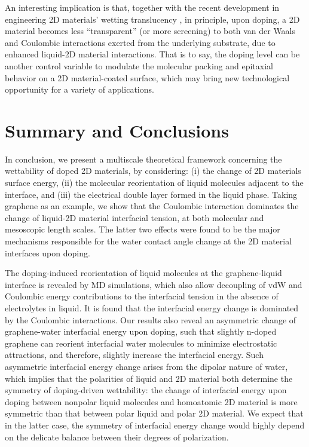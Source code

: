 \documentclass[journal=langd5,manuscript=article,email=true,hyperref=true,keywords=true]{achemso}
\begin{document}
An interesting implication is that, together with the recent
development in engineering 2D materials’ wetting translucency
\cite{raj_wettability_2013,rafiee_wetting_2012,shih_breakdown_2012,shih_wetting_2013},
in principle, upon doping, a 2D material becomes less “transparent” (or more screening)
to both van der Waals and Coulombic interactions exerted from the underlying
substrate, due to enhanced liquid-2D material interactions. That is to say, the doping level can be
another control variable to modulate the molecular packing and
epitaxial behavior on a 2D material-coated surface, which may bring
new technological opportunity for a variety of applications.


\section{Summary and Conclusions}
\label{sec:org0fb53ec}

In conclusion, we present a multiscale theoretical framework
concerning the wettability of doped 2D materials, by considering: (i)
the change of 2D materials surface energy, (ii) the molecular
reorientation of liquid molecules adjacent to the interface, and (iii)
the electrical double layer formed in the liquid phase. Taking
graphene as an example, we show that the Coulombic interaction
dominates the change of liquid-2D material interfacial tension, at
both molecular and mesoscopic length scales. The latter two effects were
found to be the major mechanisms responsible for the water contact angle
change at the 2D material interfaces upon doping.

The doping-induced reorientation of liquid molecules at the
graphene-liquid interface is revealed by MD simulations, which also
allow decoupling of vdW and Coulombic energy contributions to the
interfacial tension in the absence of electrolytes in liquid. It is
found that the interfacial energy change is dominated by the Coulombic
interactions. Our results also reveal an asymmetric change of
graphene-water interfacial energy upon doping, such that slightly
n-doped graphene can reorient interfacial water molecules to minimize
electrostatic attractions, and therefore, slightly increase the
interfacial energy. Such asymmetric interfacial energy change arises
from the dipolar nature of water, which implies that the polarities of
liquid and 2D material both determine the symmetry of
doping-driven wettability: the change of interfacial energy upon
doping between nonpolar liquid molecules and homoatomic 2D material is
more symmetric than that between polar liquid and polar 2D
material. We expect that in the latter case, the symmetry of
interfacial energy change would highly depend on the delicate balance
between their degrees of polarization.
\end{document}
